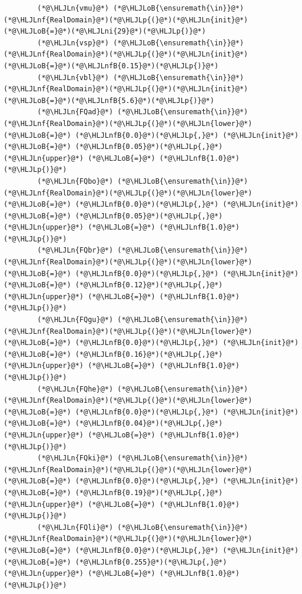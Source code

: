 \documentclass[12pt,a4paper]{article}
\newcommand{\HLJLn}[1]{#1}
\newcommand{\HLJLnf}[1]{\textcolor[RGB]{66,102,213}{#1}}
\newcommand{\HLJLnfB}[1]{\textcolor[RGB]{59,151,46}{#1}}
\newcommand{\HLJLni}[1]{\textcolor[RGB]{59,151,46}{#1}}
\newcommand{\HLJLoB}[1]{\textcolor[RGB]{102,102,102}{\textbf{#1}}}
\newcommand{\HLJLp}[1]{#1}
\begin{document}
\begin{lstlisting}
        (*@\HLJLn{vmu}@*) (*@\HLJLoB{\ensuremath{\in}}@*) (*@\HLJLnf{RealDomain}@*)(*@\HLJLp{(}@*)(*@\HLJLn{init}@*) (*@\HLJLoB{=}@*)(*@\HLJLni{29}@*)(*@\HLJLp{)}@*)
        (*@\HLJLn{vsp}@*) (*@\HLJLoB{\ensuremath{\in}}@*) (*@\HLJLnf{RealDomain}@*)(*@\HLJLp{(}@*)(*@\HLJLn{init}@*) (*@\HLJLoB{=}@*)(*@\HLJLnfB{0.15}@*)(*@\HLJLp{)}@*)
        (*@\HLJLn{vbl}@*) (*@\HLJLoB{\ensuremath{\in}}@*) (*@\HLJLnf{RealDomain}@*)(*@\HLJLp{(}@*)(*@\HLJLn{init}@*) (*@\HLJLoB{=}@*)(*@\HLJLnfB{5.6}@*)(*@\HLJLp{)}@*)
        (*@\HLJLn{FQad}@*) (*@\HLJLoB{\ensuremath{\in}}@*) (*@\HLJLnf{RealDomain}@*)(*@\HLJLp{(}@*)(*@\HLJLn{lower}@*) (*@\HLJLoB{=}@*) (*@\HLJLnfB{0.0}@*)(*@\HLJLp{,}@*) (*@\HLJLn{init}@*) (*@\HLJLoB{=}@*) (*@\HLJLnfB{0.05}@*)(*@\HLJLp{,}@*) (*@\HLJLn{upper}@*) (*@\HLJLoB{=}@*) (*@\HLJLnfB{1.0}@*)(*@\HLJLp{)}@*)
        (*@\HLJLn{FQbo}@*) (*@\HLJLoB{\ensuremath{\in}}@*) (*@\HLJLnf{RealDomain}@*)(*@\HLJLp{(}@*)(*@\HLJLn{lower}@*) (*@\HLJLoB{=}@*) (*@\HLJLnfB{0.0}@*)(*@\HLJLp{,}@*) (*@\HLJLn{init}@*) (*@\HLJLoB{=}@*) (*@\HLJLnfB{0.05}@*)(*@\HLJLp{,}@*) (*@\HLJLn{upper}@*) (*@\HLJLoB{=}@*) (*@\HLJLnfB{1.0}@*)(*@\HLJLp{)}@*)
        (*@\HLJLn{FQbr}@*) (*@\HLJLoB{\ensuremath{\in}}@*) (*@\HLJLnf{RealDomain}@*)(*@\HLJLp{(}@*)(*@\HLJLn{lower}@*) (*@\HLJLoB{=}@*) (*@\HLJLnfB{0.0}@*)(*@\HLJLp{,}@*) (*@\HLJLn{init}@*) (*@\HLJLoB{=}@*) (*@\HLJLnfB{0.12}@*)(*@\HLJLp{,}@*) (*@\HLJLn{upper}@*) (*@\HLJLoB{=}@*) (*@\HLJLnfB{1.0}@*)(*@\HLJLp{)}@*)
        (*@\HLJLn{FQgu}@*) (*@\HLJLoB{\ensuremath{\in}}@*) (*@\HLJLnf{RealDomain}@*)(*@\HLJLp{(}@*)(*@\HLJLn{lower}@*) (*@\HLJLoB{=}@*) (*@\HLJLnfB{0.0}@*)(*@\HLJLp{,}@*) (*@\HLJLn{init}@*) (*@\HLJLoB{=}@*) (*@\HLJLnfB{0.16}@*)(*@\HLJLp{,}@*) (*@\HLJLn{upper}@*) (*@\HLJLoB{=}@*) (*@\HLJLnfB{1.0}@*)(*@\HLJLp{)}@*)
        (*@\HLJLn{FQhe}@*) (*@\HLJLoB{\ensuremath{\in}}@*) (*@\HLJLnf{RealDomain}@*)(*@\HLJLp{(}@*)(*@\HLJLn{lower}@*) (*@\HLJLoB{=}@*) (*@\HLJLnfB{0.0}@*)(*@\HLJLp{,}@*) (*@\HLJLn{init}@*) (*@\HLJLoB{=}@*) (*@\HLJLnfB{0.04}@*)(*@\HLJLp{,}@*) (*@\HLJLn{upper}@*) (*@\HLJLoB{=}@*) (*@\HLJLnfB{1.0}@*)(*@\HLJLp{)}@*)
        (*@\HLJLn{FQki}@*) (*@\HLJLoB{\ensuremath{\in}}@*) (*@\HLJLnf{RealDomain}@*)(*@\HLJLp{(}@*)(*@\HLJLn{lower}@*) (*@\HLJLoB{=}@*) (*@\HLJLnfB{0.0}@*)(*@\HLJLp{,}@*) (*@\HLJLn{init}@*) (*@\HLJLoB{=}@*) (*@\HLJLnfB{0.19}@*)(*@\HLJLp{,}@*) (*@\HLJLn{upper}@*) (*@\HLJLoB{=}@*) (*@\HLJLnfB{1.0}@*)(*@\HLJLp{)}@*)
        (*@\HLJLn{FQli}@*) (*@\HLJLoB{\ensuremath{\in}}@*) (*@\HLJLnf{RealDomain}@*)(*@\HLJLp{(}@*)(*@\HLJLn{lower}@*) (*@\HLJLoB{=}@*) (*@\HLJLnfB{0.0}@*)(*@\HLJLp{,}@*) (*@\HLJLn{init}@*) (*@\HLJLoB{=}@*) (*@\HLJLnfB{0.255}@*)(*@\HLJLp{,}@*) (*@\HLJLn{upper}@*) (*@\HLJLoB{=}@*) (*@\HLJLnfB{1.0}@*)(*@\HLJLp{)}@*)

\end{lstlisting}
\end{document}

